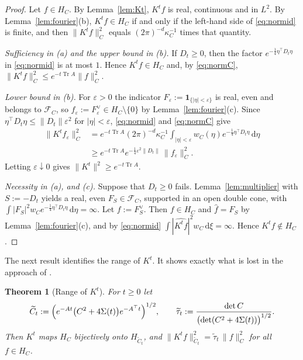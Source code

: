 \documentclass[11pt]{amsart}
\numberwithin{equation}{section}
\newtheorem{theorem}{Theorem}[section]
\theoremstyle{definition}
\theoremstyle{remark}
\newcommand{\Tr}{\operatorname{Tr}}
\newcommand{\dd}{\,\mathrm{d}}
\newcommand{\FC}[1]{\mathcal{F}_{#1}}
\newcommand{\Ct}{\widetilde{C}_t}
\newcommand{\taut}{\widetilde{\tau}_t}
\newcommand{\hatf}[1]{\widehat{#1}}
\newcommand{\tp}{\top}
\begin{document}
\begin{proof}
Let $f\in H_C$. By Lemma~\ref{lem:Kt}, $K^tf$ is real, continuous and in $L^2$. By Lemma~\ref{lem:fourier}(b),
$K^tf\in H_C$ if and only if the left-hand side of \eqref{eq:normid} is finite, and then $\|K^tf\|_C^2$ equals
$(2\pi)^{-d}\kappa_C^{-1}$ times that quantity.

\emph{Sufficiency in (a) and the upper bound in (b).} If $D_t\ge0$, then the factor $e^{-\frac14\eta^\tp D_t\eta}$ in
\eqref{eq:normid} is at most $1$. Hence $K^tf\in H_C$ and, by \eqref{eq:normC}, $\|K^tf\|_C^2\le e^{-t\Tr A}\|f\|_C^2$.

\emph{Lower bound in (b).} For $\varepsilon>0$ the indicator $F_\varepsilon:=\mathbf 1_{\{|\eta|<\varepsilon\}}$ is real,
even and belongs to $\FC{C}$, so $f_\varepsilon:=F_\varepsilon^\vee\in H_C\setminus\{0\}$ by Lemma~\ref{lem:fourier}(c).
Since $\eta^\tp D_t\eta\le\|D_t\|\varepsilon^2$ for $|\eta|<\varepsilon$, \eqref{eq:normid} and \eqref{eq:normC} give
\begin{align*}
\|K^tf_\varepsilon\|_C^2
&=e^{-t\Tr A}(2\pi)^{-d}\kappa_C^{-1}\int_{|\eta|<\varepsilon}w_C(\eta)e^{-\frac14\eta^\tp D_t\eta}\dd\eta\\
&\ge e^{-t\Tr A}e^{-\frac14\varepsilon^2\|D_t\|}\,\|f_\varepsilon\|_C^2 .
\end{align*}
Letting $\varepsilon\downarrow0$ gives $\|K^t\|^2\ge e^{-t\Tr A}$.

\emph{Necessity in (a), and (c).} Suppose that $D_t\ge0$ fails. Lemma~\ref{lem:multiplier} with $S:=-D_t$ yields a real,
even $F_S\in\FC{C}$, supported in an open double cone, with $\int|F_S|^2w_Ce^{-\frac14\eta^\tp D_t\eta}\dd\eta=\infty$.
Let $f:=F_S^\vee$. Then $f\in H_C$ and $\hatf f=F_S$ by Lemma~\ref{lem:fourier}(c), and by \eqref{eq:normid}
$\int|\hatf{K^tf}|^2w_C\dd\xi=\infty$. Hence $K^tf\notin H_C$.
\end{proof}

The next result identifies the range of $K^t$. It shows exactly what is lost in the approach of \cite{PSWPN}.

\begin{theorem}[Range of $K^t$]\label{thm:range}
For $t\ge0$ let
\begin{equation}\label{eq:Ctilde}
\Ct:=\Bigl(e^{-At}\bigl(C^2+4\Sigma(t)\bigr)e^{-A^\tp t}\Bigr)^{1/2},\qquad
\taut:=\frac{\det C}{\bigl(\det(C^2+4\Sigma(t))\bigr)^{1/2}} .
\end{equation}
Then $K^t$ maps $H_C$ bijectively onto $H_{\Ct}$, and $\|K^tf\|_{\Ct}^2=\taut\,\|f\|_C^2$ for all $f\in H_C$.
\end{theorem}
\end{document}
